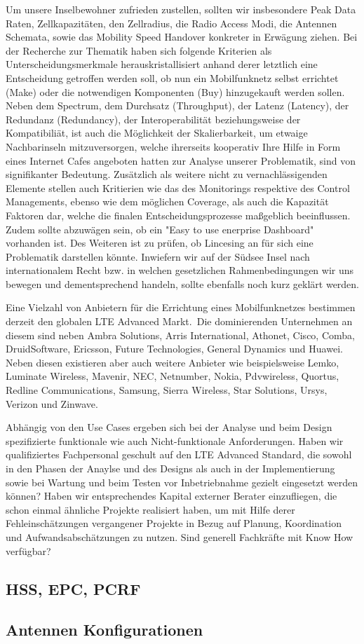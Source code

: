 	Um unsere Inselbewohner zufrieden zustellen, sollten wir insbesondere Peak Data Raten, Zellkapazitäten, den Zellradius, die Radio Access Modi, die Antennen Schemata, sowie das Mobility Speed Handover konkreter in Erwägung ziehen.
	Bei der Recherche zur Thematik haben sich folgende Kriterien als Unterscheidungsmerkmale herauskristallisiert anhand derer letztlich eine Entscheidung getroffen werden soll, ob nun ein Mobilfunknetz selbst errichtet (Make) oder die notwendigen Komponenten (Buy) hinzugekauft werden sollen. Neben dem Spectrum, dem Durchsatz (Throughput), der Latenz (Latency),  der Redundanz (Redundancy), der Interoperabilität beziehungsweise der Kompatibiliät, ist auch die Möglichkeit der Skalierbarkeit, um etwaige Nachbarinseln mitzuversorgen, welche ihrerseits kooperativ Ihre Hilfe in Form eines Internet Cafes angeboten hatten zur Analyse unserer Problematik, sind von signifikanter Bedeutung. Zusätzlich  als weitere nicht zu vernachlässigenden Elemente stellen auch Kritierien wie das des Monitorings respektive des Control Managements, ebenso wie dem möglichen Coverage, als auch die Kapazität  Faktoren dar, welche die finalen Entscheidungsprozesse maßgeblich beeinflussen. Zudem sollte abzuwägen sein, ob ein "Easy to use enerprise Dashboard" vorhanden ist. Des Weiteren ist zu prüfen, ob Lincesing an für sich eine Problematik darstellen könnte. Inwiefern wir auf der Südsee Insel nach internationalem Recht bzw. in welchen gesetzlichen Rahmenbedingungen wir uns bewegen und dementsprechend handeln, sollte ebenfalls noch kurz geklärt werden.
	
	Eine Vielzahl von Anbietern für die Errichtung eines Mobilfunknetzes bestimmen derzeit den globalen LTE Advanced Markt.\ Die dominierenden Unternehmen an diesem sind neben Ambra Solutions, Arris International,
	Athonet, Cisco, Comba, DruidSoftware, Ericsson, Future Technologies, General Dynamics und 
	Huawei. Neben diesen existieren aber auch weitere Anbieter wie beispielsweise Lemko, Luminate Wireless,
	Mavenir,
	NEC,
	Netnumber,
	Nokia,
	Pdvwireless,
	Quortus,
	Redline Communications,
	Samsung,
	Sierra Wireless,
	Star Solutions,
	Ursys,
	Verizon und 
	Zinwave.
	
	Abhängig von den Use Cases ergeben sich bei der Analyse und beim Design spezifizierte funktionale wie auch Nicht-funktionale Anforderungen. Haben wir qualifiziertes Fachpersonal geschult auf den LTE Advanced Standard, die sowohl in den Phasen der Anaylse und des Designs als auch in der Implementierung sowie bei Wartung und beim Testen vor Inbetriebnahme gezielt eingesetzt werden können? Haben wir entsprechendes Kapital externer Berater einzufliegen, die schon einmal ähnliche Projekte realisiert haben, um mit Hilfe derer Fehleinschätzungen vergangener Projekte in Bezug auf Planung, Koordination und Aufwandsabschätzungen zu nutzen. Sind generell Fachkräfte mit Know How verfügbar?
	\subsection{HSS, EPC, PCRF}
	\label{subsec:Antennen HSS, EPC, PCRF}
	
	\subsection{Antennen Konfigurationen}
	\label{subsec:Antennen Konfigurationen}
	
